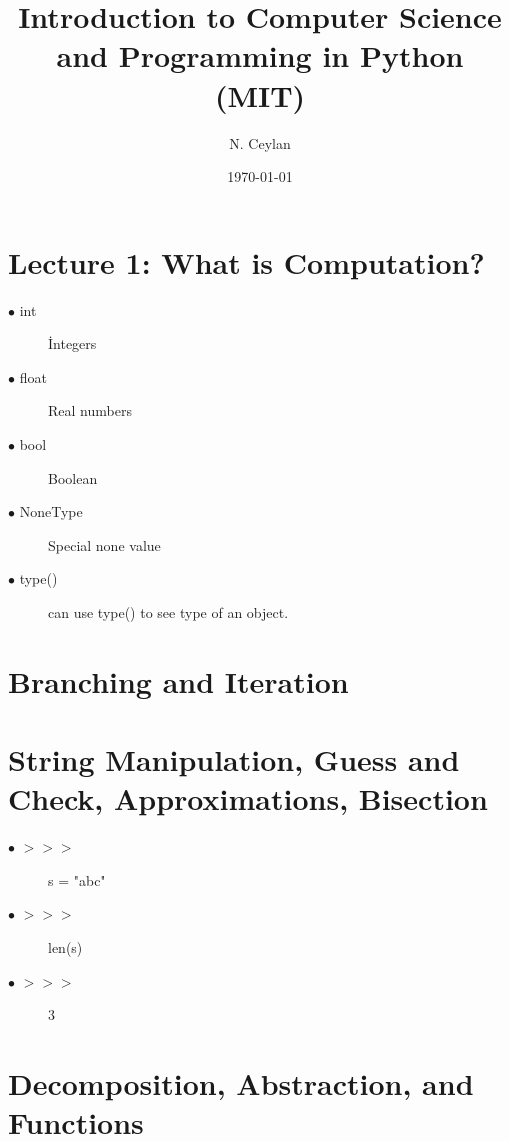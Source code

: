 \documentclass[letterpaper,12pt]{article}
\begin{document}
\title{Introduction to Computer Science and Programming in Python (MIT)}
\author{N. Ceylan}
\date{\today}
\maketitle



\section{Lecture 1: What is Computation?}




\begin{description}

	\item[$\bullet$ int] İntegers
	\item[$\bullet$ float] Real numbers
		\item[$\bullet$ bool] Boolean
	\item[$\bullet$ NoneType] Special none value
	\item[$\bullet$ type()] can use type() to see type of an object.
	
	
\end{description}

\section{ Branching and Iteration}




\section{String Manipulation, Guess and Check, Approximations, Bisection}


\begin{description}
	
	\item[$\bullet$ $>>>$] s = "abc"
	\item[$\bullet$ $>>>$] len(s)
    \item[$\bullet$ $>>>$] 3


	
	
\end{description}

\section{Decomposition, Abstraction, and Functions}
\end{document}
